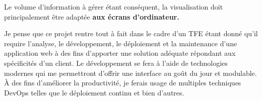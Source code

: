 Le volume d'information à gérer étant conséquent, la visualisation doit principalement être adaptée \textbf{aux écrans d'ordinateur.}


Je pense que ce projet rentre tout à fait dans le cadre d'un TFE étant donné qu'il require l'analyse, le développement, le déploiement et la maintenance d'une application web à des fins d'apporter une solution adéquate répondant aux spécificités d'un client.
Le développement se fera à l'aide de technologies modernes qui me permettront d'offrir une interface au goût du jour et modulable. À des fins d'améliorer la productivité, je ferais usage de multiples techniques DevOps telles que le déploiement continu et bien d'autres.


